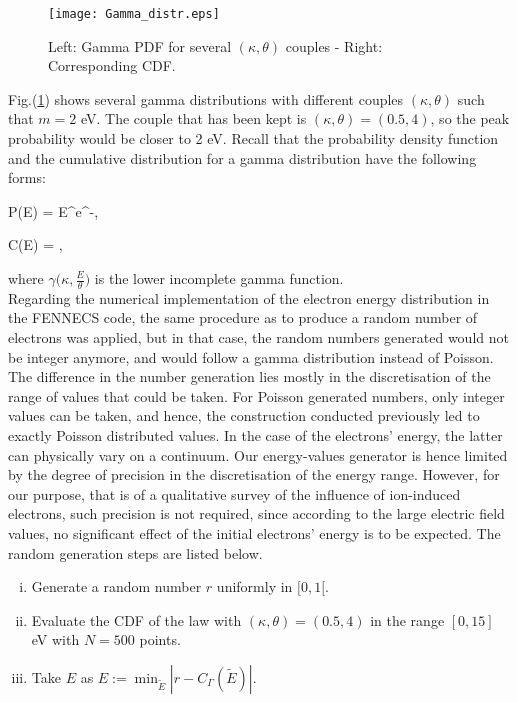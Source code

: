 \begin{figure}[h!]
\centering
	\texttt{[image: Gamma\_distr.eps]}
	\caption{\label{Gamma_distr} Left: Gamma PDF for several $(\kappa, \theta)$ couples - Right: Corresponding CDF. }
\end{figure}  

\noindent Fig.(\ref{Gamma_distr}) shows several gamma distributions with different couples $(\kappa, \theta)$ such that $m=2$ eV. The couple that has been kept is $(\kappa,\theta) = (0.5,4)$, so the peak probability would be closer to 2 eV. Recall that the probability density function and the cumulative distribution for a gamma distribution have the following forms: 

\beq
P(E) = E^{}e^{-},
\eeq

\beq
C(E) = ,
\eeq

\noindent where $\gamma{\Big(\kappa, \frac{E}{\theta}\Big)}$ is the lower incomplete gamma function.\\ 


\noindent Regarding the numerical implementation of the electron energy distribution in the FENNECS code, the same procedure as to produce a random number of electrons was applied, but in that case, the random numbers generated would not be integer anymore, and would follow a gamma distribution instead of Poisson. The difference in the number generation lies mostly in the discretisation of the range of values that could be taken. For Poisson generated numbers, only integer values can be taken, and hence, the construction conducted previously led to exactly Poisson distributed values. In the case of the electrons' energy, the latter can physically vary on a continuum. Our energy-values generator is hence limited by the degree of precision in the discretisation of the energy range. However, for our purpose, that is of a qualitative survey of the influence of ion-induced electrons, such precision is not required, since according to the large electric field values, no significant effect of the initial electrons' energy is to be expected. The random generation steps are listed below.

\begin{enumerate}[i)]
\item{Generate a random number $r$ uniformly  in $[0,1[. $}
\item{Evaluate the CDF of the law with  $(\kappa,\theta) = (0.5,4)$ in the range $[0,15]$ eV with $N=500$ points.}
\item{Take $E$ as $E := \min_{\tilde{E}} |r-C_{\Gamma}(\tilde{E})|$}.
\end{enumerate}

